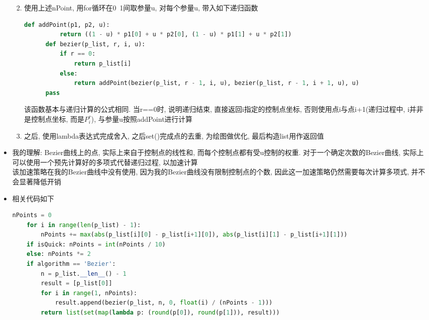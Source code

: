 \documentclass[a4paper,UTF8]{article}
\theoremstyle{definition}
\begin{document}
\begin{itemize}
\begin{enumerate}
\begin{enumerate}
    \end{enumerate}
    \item 使用上述nPoint, 用for循环在0~1间取参量u, 对每个参量u, 带入如下递归函数\begin{lstlisting}[language={Python}]
      def addPoint(p1, p2, u): 
          return ((1 - u) * p1[0] + u * p2[0], (1 - u) * p1[1] + u * p2[1])
      def bezier(p_list, r, i, u):
          if r == 0:
              return p_list[i]
          else:
              return addPoint(bezier(p_list, r - 1, i, u), bezier(p_list, r - 1, i + 1, u), u)
      pass    \end{lstlisting}
    该函数基本与递归计算的公式相同. 当r==0时, 说明递归结束, 直接返回i指定的控制点坐标, 否则使用点i与点i+1(递归过程中, i并非是控制点坐标, 而是$P_{i}^r$), 与参量u按照addPoint进行计算
    \item 之后, 使用lambda表达式完成舍入, 之后set()完成点的去重, 为绘图做优化, 最后构造list用作返回值
  \end{enumerate}
  \item 我的理解: Bezier曲线上的点, 实际上来自于控制点的线性和, 而每个控制点都有受u控制的权重. 对于一个确定次数的Bezier曲线, 实际上可以使用一个预先计算好的多项式代替递归过程, 以加速计算\\
  该加速策略在我的Bezier曲线中没有使用, 因为我的Bezier曲线没有限制控制点的个数, 因此这一加速策略仍然需要每次计算多项式, 并不会显著降低开销
  \item 相关代码如下
  \begin{lstlisting}[language={Python}]
    nPoints = 0
    for i in range(len(p_list) - 1):
        nPoints += max(abs(p_list[i][0] - p_list[i+1][0]), abs(p_list[i][1] - p_list[i+1][1]))
    if isQuick: nPoints = int(nPoints / 10)
    else: nPoints *= 2
    if algorithm == 'Bezier':
        n = p_list.__len__() - 1
        result = [p_list[0]]
        for i in range(1, nPoints):
            result.append(bezier(p_list, n, 0, float(i) / (nPoints - 1)))
        return list(set(map(lambda p: (round(p[0]), round(p[1])), result)))\end{lstlisting}
\end{itemize}
\end{document}
